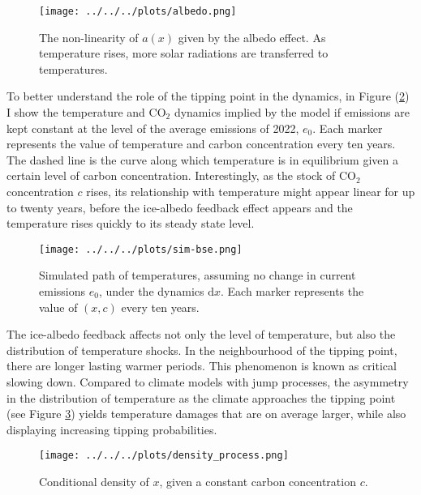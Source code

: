 \documentclass[../../main.tex]{subfiles}
\begin{document}
\begin{figure}[H]
    \centering
    \texttt{[image: ../../../plots/albedo.png]}
    \caption{The non-linearity of $a(x)$ given by the albedo effect. As temperature rises, more solar radiations are transferred to temperatures.}
    \label{fig:albedo}
\end{figure}

To better understand the role of the tipping point in the dynamics, in Figure (\ref{fig:x-sim}) I show the temperature and CO$_2$ dynamics implied by the model if emissions are kept constant at the level of the average emissions of 2022, $e_0$. Each marker represents the value of temperature and carbon concentration every ten years. The dashed line is the curve along which temperature is in equilibrium given a certain level of carbon concentration. Interestingly, as the stock of CO$_2$ concentration $c$ rises, its relationship with temperature might appear linear for up to twenty years, before the ice-albedo feedback effect appears and the temperature rises quickly to its steady state level.


\begin{figure}[H]
    \centering
    \texttt{[image: ../../../plots/sim-bse.png]}
    \caption{Simulated path of temperatures, assuming no change in current emissions $e_0$, under the dynamics $\text{d}x$. Each marker represents the value of $(x, c)$ every ten years.}
    \label{fig:x-sim}
\end{figure}

The ice-albedo feedback affects not only the level of temperature, but also the distribution of temperature shocks. In the neighbourhood of the tipping point, there are longer lasting warmer periods. This phenomenon is known as critical slowing down. Compared to climate models with jump processes, the asymmetry in the distribution of temperature as the climate approaches the tipping point (see Figure \ref{fig:x-dens}) yields temperature damages that are on average larger, while also displaying increasing tipping probabilities.

\begin{figure}[H]
    \centering
    \texttt{[image: ../../../plots/density\_process.png]}
    \caption{Conditional density of $x$, given a constant carbon concentration $c$.}
    \label{fig:x-dens}
\end{figure}
\end{document}
